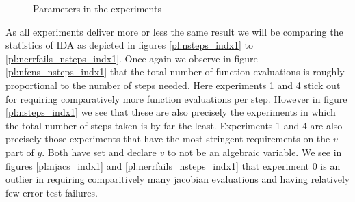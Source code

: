 \documentclass{report}
\begin{document}
\begin{figure}[h]
\centering

\caption{Parameters in the experiments}
\label{tb:indx1_experiment_params}
\end{figure}

As all experiments deliver more or less the same result we will be comparing the statistics of IDA as depicted in figures \ref{pl:nsteps_indx1} to \ref{pl:nerrfails_nsteps_indx1}. Once again we observe in figure \ref{pl:nfcns_nsteps_indx1} that the total number of function evaluations is roughly proportional to the number of steps needed. Here experiments 1 and 4 stick out for requiring comparatively more function evaluations per step. However in figure \ref{pl:nsteps_indx1} we see that these are also precisely the experiments in which the total number of steps taken is by far the least. Experiments 1 and 4 are also precisely those experiments that have the most stringent requirements on the $v$ part of $y$. Both have set  and declare $v$ to not be an algebraic variable. We see in figures \ref{pl:njacs_indx1} and \ref{pl:nerrfails_nsteps_indx1} that experiment 0 is an outlier in requiring comparitively many jacobian evaluations and having relatively few error test failures.
\end{document}
